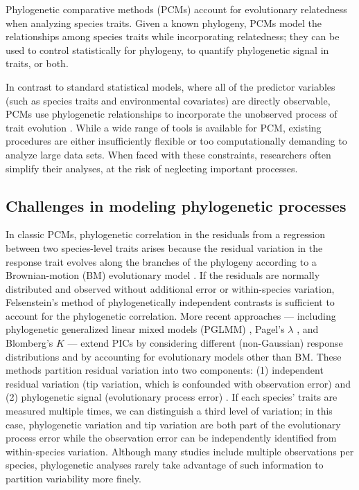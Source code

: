 \documentclass[12pt]{article}
\begin{document}
Phylogenetic comparative methods (PCMs) account for evolutionary relatedness when analyzing species traits.
Given a known phylogeny, PCMs model the relationships among species traits while incorporating relatedness; they can be used to control statistically for phylogeny, to quantify phylogenetic signal in traits, or both. 

In contrast to standard statistical models, where all of the predictor variables (such as species traits and environmental covariates) are directly observable, PCMs use phylogenetic relationships to incorporate the unobserved process of trait evolution \citep{felsenstein1985phylogenies, butler2004phylogenetic, hansen2012interpreting}. 
While a wide range of tools is available for PCM, existing procedures are either insufficiently flexible or too computationally demanding to analyze large data sets.
When faced with these constraints, researchers often simplify their analyses, at the risk of neglecting important processes.

\subsection*{Challenges in modeling phylogenetic processes}

In classic PCMs, phylogenetic correlation in the residuals from a regression between two species-level traits arises because the residual variation in the response trait evolves along the branches of the phylogeny according to a Brownian-motion (BM) evolutionary model \citep{felsenstein1985phylogenies}. 
If the residuals are normally distributed and observed without additional error or within-species variation, Felsenstein's method of phylogenetically independent contrasts  \citep[PICS:][]{felsenstein1985phylogenies} is sufficient to account for the phylogenetic correlation.
More recent approaches --- including phylogenetic generalized linear mixed models (PGLMM) \citep{ives2011generalized, housworth2004phylogenetic}, Pagel's $\lambda$ \citep{pagel1999inferring}, and Blomberg's $K$ \citep{blomberg2003testing} --- extend PICs by considering different (non-Gaussian) response distributions and by accounting for evolutionary models other than BM.
These methods partition residual variation into two components: (1) independent residual variation (tip variation, which is confounded with observation error) and (2) phylogenetic signal (evolutionary process error) \citep{hansen2012interpreting, housworth2004phylogenetic}.
If each species' traits are measured multiple times, we can distinguish a third level of variation; in this case, phylogenetic variation and tip variation are both part of the evolutionary process error while the observation error can be independently identified from within-species variation.
Although many studies include multiple observations per species, phylogenetic analyses rarely take advantage of such information to partition variability more finely.
\end{document}
